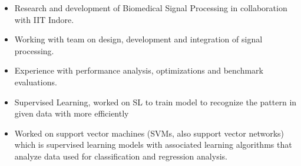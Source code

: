 \documentclass[10pt,a4paper,ragged2e]{altacv}
\begin{document}

\begin{fullwidth}
\makecvheader
\end{fullwidth}



\begin{itemize}
\item Research and development of Biomedical Signal Processing in collaboration with IIT Indore.
\smallskip
\item Working with team on design, development and integration of signal processing.
\smallskip
\item Experience with performance analysis, optimizations and benchmark evaluations.
\end{itemize}

\divider

\begin{itemize}
\item Supervised Learning, worked on SL to train model to recognize the pattern in given data with more efficiently 
\smallskip
\item Worked on support vector machines (SVMs, also support vector networks) which is supervised learning models with associated learning algorithms that analyze data used for classification and regression analysis.
\end{itemize}
\end{document}
